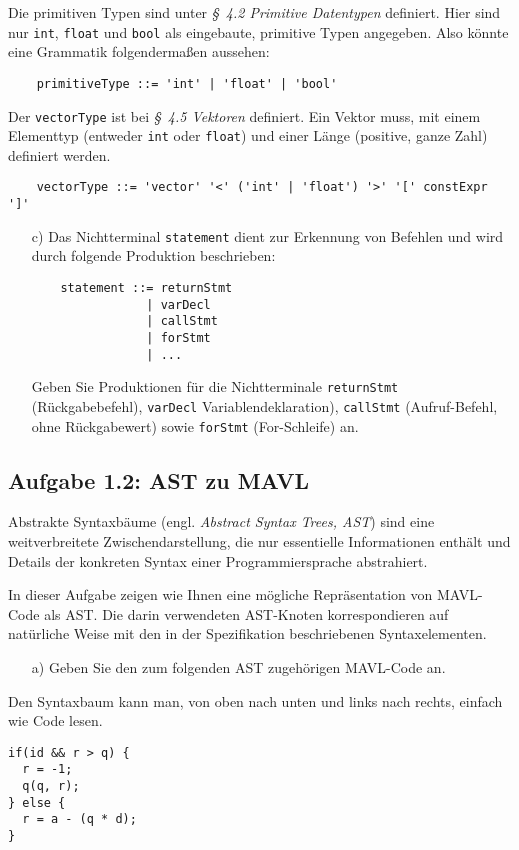 \documentclass[
  ngerman,
  DIV=14
]{scrartcl}
\begin{document}
Die primitiven Typen sind unter \emph{§~4.2 Primitive Datentypen} definiert. Hier sind nur \texttt{int}, \texttt{float} und \texttt{bool} als eingebaute, primitive Typen angegeben. Also könnte eine Grammatik folgendermaßen aussehen:
\begin{verbatim}
    primitiveType ::= 'int' | 'float' | 'bool'
\end{verbatim}
Der \texttt{vectorType} ist bei \emph{§~4.5 Vektoren} definiert. Ein Vektor muss, mit einem Elementtyp (entweder \texttt{int} oder \texttt{float}) und einer Länge (positive, ganze Zahl) definiert werden.
\begin{verbatim}
    vectorType ::= 'vector' '<' ('int' | 'float') '>' '[' constExpr ']'
\end{verbatim}
\begin{enumerate}
\item[c)]
Das Nichtterminal \texttt{statement} dient zur Erkennung von Befehlen und wird durch folgende Produktion beschrieben:
\begin{verbatim}
    statement ::= returnStmt
                | varDecl
                | callStmt
                | forStmt
                | ...
\end{verbatim}
Geben Sie Produktionen für die Nichtterminale \texttt{returnStmt} (Rückgabebefehl), \texttt{varDecl} Variablendeklaration), \texttt{callStmt} (Aufruf-Befehl, ohne Rückgabewert) sowie \texttt{forStmt} (For-Schleife) an.
\end{enumerate}



\subsection*{Aufgabe 1.2: AST zu MAVL}
Abstrakte Syntaxbäume (engl. \emph{Abstract Syntax Trees, AST}) sind eine weitverbreitete Zwischendarstellung, die nur essentielle Informationen enthält und Details der konkreten Syntax einer Programmiersprache abstrahiert.

\medskip\noindent
In dieser Aufgabe zeigen wie Ihnen eine mögliche Repräsentation von MAVL-Code als AST. Die darin verwendeten AST-Knoten korrespondieren auf natürliche Weise mit den in der Spezifikation beschriebenen Syntaxelementen. 
\begin{enumerate}
\item [a)]
Geben Sie den zum folgenden AST zugehörigen MAVL-Code an.  
\end{enumerate}
Den Syntaxbaum kann man, von oben nach unten und links nach rechts, einfach wie Code lesen.
\begin{lstlisting}
if(id && r > q) {
  r = -1;
  q(q, r);
} else {
  r = a - (q * d);
}
\end{lstlisting}
\end{document}
